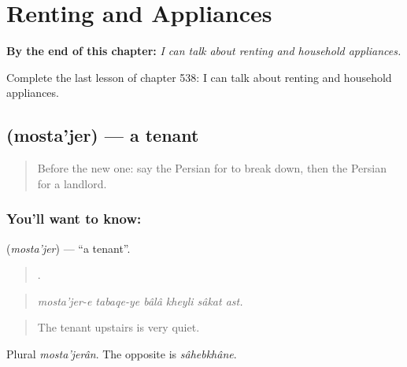 
\chapter{Renting and Appliances}
\label{ch:fa-renting-and-appliances}

\begin{chapteropening}
\textbf{By the end of this chapter:} \emph{I can talk about renting and household appliances.}

Complete the last lesson of chapter 538: I can talk about renting and household appliances.
\end{chapteropening}

\section[\texorpdfstring{\fa{مستاجر} (mosta'jer)}{مستاجر (mosta'jer)}]{ (mosta'jer) — a tenant}

\label{lesson:FA-C538-mostajer}



\begin{quote}
Before the new one: say the Persian for to break down, then the Persian for a landlord.
\end{quote}

\subsection*{You'll want to know: }
\textbf{} (\emph{mosta'jer}) — \textquotedblleft{}a tenant\textquotedblright{}.

\begin{quote}
     .
\end{quote}

\begin{quote}
\emph{mosta'jer-e tabaqe-ye bâlâ kheyli sâkat ast.}
\end{quote}

\begin{quote}
The tenant upstairs is very quiet.
\end{quote}

Plural \emph{mosta'jerân}. The opposite is \emph{sâhebkhâne}.

